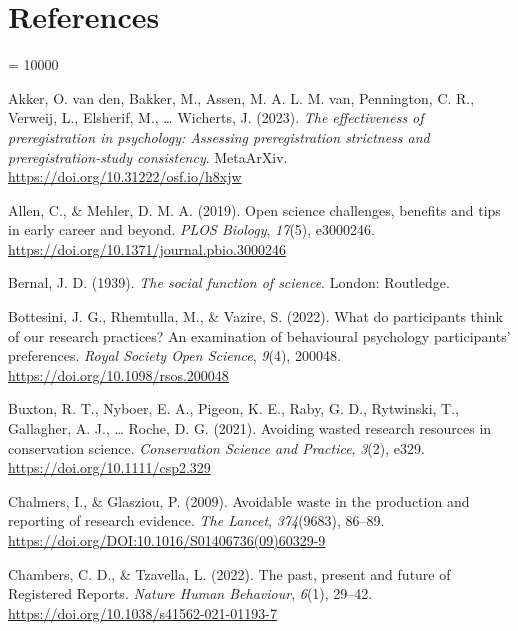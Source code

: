 \documentclass[
  ,jou, a4paper,floatsintext]{apa6}
\newlength{\cslhangindent}
\newlength{\cslentryspacingunit} %
\newenvironment{CSLReferences}[2] %
 {%
  \setlength{\parindent}{0pt}
  \ifodd #1
  \let\oldpar\par
  \def\par{\hangindent=\cslhangindent\oldpar}
  \fi
  \setlength{\parskip}{#2\cslentryspacingunit}
 }%
 {}
\begin{document}
\hypertarget{references}{%
\section{References}\label{references}}

\begingroup

\interlinepenalty = 10000

\hypertarget{refs}{}
\begin{CSLReferences}{1}{0}
\leavevmode{}%
Akker, O. van den, Bakker, M., Assen, M. A. L. M. van, Pennington, C. R., Verweij, L., Elsherif, M., \ldots{} Wicherts, J. (2023). \emph{The effectiveness of preregistration in psychology: {Assessing} preregistration strictness and preregistration-study consistency}. {MetaArXiv}. \url{https://doi.org/10.31222/osf.io/h8xjw}

\leavevmode{}%
Allen, C., \& Mehler, D. M. A. (2019). Open science challenges, benefits and tips in early career and beyond. \emph{PLOS Biology}, \emph{17}(5), e3000246. \url{https://doi.org/10.1371/journal.pbio.3000246}

\leavevmode{}%
Bernal, J. D. (1939). \emph{The social function of science}. {London}: {Routledge}.

\leavevmode{}%
Bottesini, J. G., Rhemtulla, M., \& Vazire, S. (2022). What do participants think of our research practices? {An} examination of behavioural psychology participants' preferences. \emph{Royal Society Open Science}, \emph{9}(4), 200048. \url{https://doi.org/10.1098/rsos.200048}

\leavevmode{}%
Buxton, R. T., Nyboer, E. A., Pigeon, K. E., Raby, G. D., Rytwinski, T., Gallagher, A. J., \ldots{} Roche, D. G. (2021). Avoiding wasted research resources in conservation science. \emph{Conservation Science and Practice}, \emph{3}(2), e329. \url{https://doi.org/10.1111/csp2.329}

\leavevmode{}%
Chalmers, I., \& Glasziou, P. (2009). Avoidable waste in the production and reporting of research evidence. \emph{The Lancet}, \emph{374}(9683), 86--89. \url{https://doi.org/DOI:10.1016/S01406736(09)60329-9}

\leavevmode{}%
Chambers, C. D., \& Tzavella, L. (2022). The past, present and future of {Registered Reports}. \emph{Nature Human Behaviour}, \emph{6}(1), 29--42. \url{https://doi.org/10.1038/s41562-021-01193-7}


\end{CSLReferences}
\end{document}
